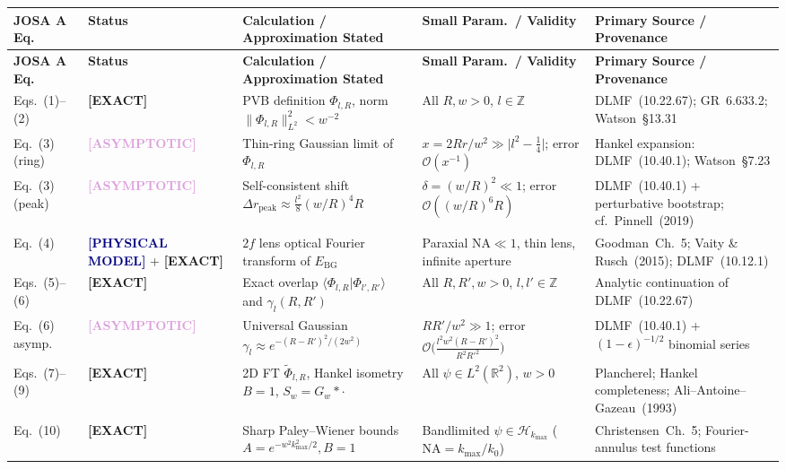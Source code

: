\documentclass[10pt,letterpaper]{article}
\newcommand{\braket}[2]{\langle #1 | #2 \rangle}
\newcommand{\norm}[1]{\lVert #1 \rVert}
\newcommand{\abs}[1]{\lvert #1 \rvert}
\newcommand{\tagexact}{\textcolor{forest}{\textbf{[EXACT]}}}
\newcommand{\tagmodel}{\textcolor{navy}{\textbf{[PHYSICAL MODEL]}}}
\newcommand{\tagasymp}{\textcolor{plum}{\textbf{[ASYMPTOTIC]}}}
\numberwithin{equation}{section}
\begin{document}
\begin{center}
\scriptsize
\renewcommand{\arraystretch}{1.18}
\setlength{\tabcolsep}{3.5pt}
\begin{longtable}{@{}p{1.5cm}p{2.05cm}p{4.3cm}p{3.6cm}p{4.1cm}@{}}
\toprule
\textbf{JOSA A Eq.} & \textbf{Status} & \textbf{Calculation / Approximation Stated} & \textbf{Small Param.\ / Validity} & \textbf{Primary Source / Provenance} \\
\midrule
\endfirsthead
\toprule
\textbf{JOSA A Eq.} & \textbf{Status} & \textbf{Calculation / Approximation Stated} & \textbf{Small Param.\ / Validity} & \textbf{Primary Source / Provenance} \\
\midrule
\endhead
\bottomrule
\endfoot
Eqs.~(1)--(2) & \tagexact{} & PVB definition $\Phi_{l,R}$, norm $\norm{\Phi_{l,R}}_{L^2}^2 < w^{-2}$ & All $R, w > 0$, $l \in \mathbb{Z}$ & DLMF~(10.22.67); GR~6.633.2; Watson~\S13.31 \\
Eq.~(3) (ring) & \tagasymp{} & Thin-ring Gaussian limit of $\Phi_{l,R}$ & $x = 2Rr/w^2 \gg \abs{l^2 - \frac{1}{4}}$; error $\mathcal{O}(x^{-1})$ & Hankel expansion: DLMF~(10.40.1); Watson~\S7.23 \\
Eq.~(3) (peak) & \tagasymp{} & Self-consistent shift $\Delta r_{\mathrm{peak}} \approx \frac{l^2}{8}(w/R)^4 R$ & $\delta = (w/R)^2 \ll 1$; error $\mathcal{O}((w/R)^6 R)$ & DLMF~(10.40.1) + perturbative bootstrap; cf.\ Pinnell~(2019) \\
Eq.~(4) & \tagmodel{} + \tagexact{} & $2f$ lens optical Fourier transform of $E_{\mathrm{BG}}$ & Paraxial $\mathrm{NA} \ll 1$, thin lens, infinite aperture & Goodman~Ch.~5; Vaity \& Rusch~(2015); DLMF~(10.12.1) \\
Eqs.~(5)--(6) & \tagexact{} & Exact overlap $\braket{\Phi_{l,R}}{\Phi_{l',R'}}$ and $\gamma_l(R,R')$ & All $R, R', w > 0$, $l,l' \in \mathbb{Z}$ & Analytic continuation of DLMF~(10.22.67) \\
Eq.~(6) asymp. & \tagasymp{} & Universal Gaussian $\gamma_l \approx e^{-(R-R')^2/(2w^2)}$ & $RR'/w^2 \gg 1$; error $\mathcal{O}\bigl(\frac{l^2 w^2(R-R')^2}{R^2 R'^2}\bigr)$ & DLMF~(10.40.1) + $(1-\epsilon)^{-1/2}$ binomial series \\
Eqs.~(7)--(9) & \tagexact{} & 2D FT $\widetilde{\Phi}_{l,R}$, Hankel isometry $B=1$, $S_w = G_w * \cdot$ & All $\psi \in L^2(\mathbb{R}^2)$, $w > 0$ & Plancherel; Hankel completeness; Ali--Antoine--Gazeau~(1993) \\
Eq.~(10) & \tagexact{} & Sharp Paley--Wiener bounds $A = e^{-w^2 k_{\max}^2/2}, B=1$ & Bandlimited $\psi \in \mathcal{H}_{k_{\max}}$ ($\mathrm{NA} = k_{\max}/k_0$) & Christensen~Ch.~5; Fourier-annulus test functions \\

\end{longtable}
\end{center}
\end{document}
